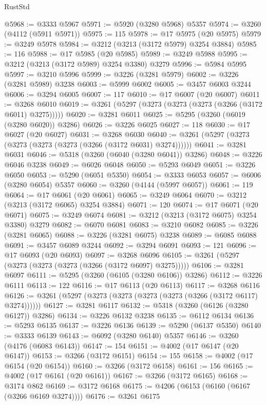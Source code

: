 \begin{lexlean}{RustStd}
\begin{coremodule}
@5968 := @3333 @5967
@5971 := @5920 (@3280 @5968) @5357
@5974 := @3260 (@4112 (@5911 @5971))
@5975 := 115
@5978 := @17 @5975 (@20 @5975)
@5979 := @3249 @5978
@5984 := @3212 (@3213 (@3172 @5979) @3254 @3884)
@5985 := 116
@5988 := @17 @5985 (@20 @5985)
@5989 := @3249 @5988
@5995 := @3212 (@3213 (@3172 @5989) @3254 @3380) @3279
@5996 := @5984 @5995
@5997 := @3210 @5996
@5999 := @3226 (@3281 @5979)
@6002 := @3226 (@3281 @5989) @3238
@6003 := @5999 @6002
@6005 := @3457 @6003 @3244
@6006 := @3294 @6005
@6007 := 117
@6010 := @17 @6007 (@20 @6007)
@6011 := @3268 @6010
@6019 := @3261 (@5297 (@3273 (@3273 (@3273 (@3266 (@3172 @6011) @3275)))))
@6020 := @3281 @6011
@6025 := @5295 (@3260 (@6019 (@3280 @6020)) @3286)
@6026 := @3226 @6025
@6027 := 118
@6030 := @17 @6027 (@20 @6027)
@6031 := @3268 @6030
@6040 := @3261 (@5297 (@3273 (@3273 (@3273 (@3273 (@3266 (@3172 @6031) @3274))))))
@6041 := @3281 @6031
@6046 := @5318 (@3260 (@6040 (@3280 @6041)) @3286)
@6048 := @3226 @6046 @3238
@6049 := @6026 @6048
@6050 := @5293 @6049
@6051 := @3226 @6050
@6053 := @5290 (@6051 @5350)
@6054 := @3333 @6053
@6057 := @6006 (@3280 @6054) @5357
@6060 := @3260 (@4144 (@5997 @6057))
@6061 := 119
@6064 := @17 @6061 (@20 @6061)
@6065 := @3249 @6064
@6070 := @3212 (@3213 (@3172 @6065) @3254 @3884)
@6071 := 120
@6074 := @17 @6071 (@20 @6071)
@6075 := @3249 @6074
@6081 := @3212 (@3213 (@3172 @6075) @3254 @3380) @3279
@6082 := @6070 @6081
@6083 := @3210 @6082
@6085 := @3226 (@3281 @6065)
@6088 := @3226 (@3281 @6075) @3238
@6089 := @6085 @6088
@6091 := @3457 @6089 @3244
@6092 := @3294 @6091
@6093 := 121
@6096 := @17 @6093 (@20 @6093)
@6097 := @3268 @6096
@6105 := @3261 (@5297 (@3273 (@3273 (@3273 (@3266 (@3172 @6097) @3275)))))
@6106 := @3281 @6097
@6111 := @5295 (@3260 (@6105 (@3280 @6106)) @3286)
@6112 := @3226 @6111
@6113 := 122
@6116 := @17 @6113 (@20 @6113)
@6117 := @3268 @6116
@6126 := @3261 (@5297 (@3273 (@3273 (@3273 (@3273 (@3266 (@3172 @6117) @3274))))))
@6127 := @3281 @6117
@6132 := @5318 (@3260 (@6126 (@3280 @6127)) @3286)
@6134 := @3226 @6132 @3238
@6135 := @6112 @6134
@6136 := @5293 @6135
@6137 := @3226 @6136
@6139 := @5290 (@6137 @5350)
@6140 := @3333 @6139
@6143 := @6092 (@3280 @6140) @5357
@6146 := @3260 (@4176 (@6083 @6143))
@6147 := 154
@6151 := @4002 (@17 @6147 (@20 @6147))
@6153 := @3266 (@3172 @6151)
@6154 := 155
@6158 := @4002 (@17 @6154 (@20 @6154))
@6160 := @3266 (@3172 @6158)
@6161 := 156
@6165 := @4002 (@17 @6161 (@20 @6161))
@6167 := @3266 (@3172 @6165)
@6168 := @3174 @862
@6169 := @3172 @6168
@6175 := @4206 (@6153 (@6160 (@6167 (@3266 @6169 @3274))))
@6176 := @3261 @6175

\end{coremodule}
\end{lexlean}
